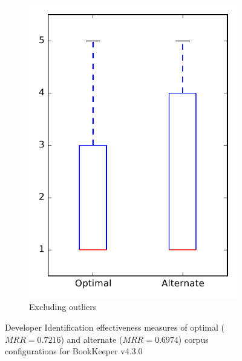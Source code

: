 \begin{figure}
\begin{subfigure}{.4\textwidth}
        \includegraphics[height=0.4\textheight]{figures/combo/dit_rq2_bookkeeper_no_outlier}
        \caption{Excluding outliers}\label{fig:combo:dit:rq2:bookkeeper_no_outlier}
    \end{subfigure}
\caption[Developer Identification effectiveness measures of optimal and alternate corpus configurations for BookKeeper v4.3.0]%
{Developer Identification effectiveness measures of optimal ($MRR=0.7216$) and alternate ($MRR=0.6974$) corpus configurations for BookKeeper v4.3.0}
\label{fig:combo:dit:rq2:bookkeeper}
\end{figure}
